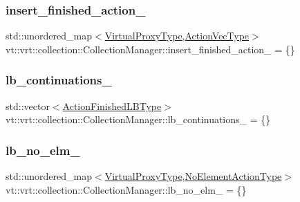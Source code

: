 \subsubsection{\texorpdfstring{insert\+\_\+finished\+\_\+action\+\_\+}{insert\_finished\_action\_}}
{\footnotesize\ttfamily std\+::unordered\+\_\+map$<$\hyperlink{namespacevt_a1b417dd5d684f045bb58a0ede70045ac}{Virtual\+Proxy\+Type},\hyperlink{structvt_1_1vrt_1_1collection_1_1_collection_manager_a51650235f0e53ae08381942eba822679}{Action\+Vec\+Type}$>$ vt\+::vrt\+::collection\+::\+Collection\+Manager\+::insert\+\_\+finished\+\_\+action\+\_\+ = \{\}\hspace{0.3cm}{\ttfamily [private]}}

\mbox{\label{structvt_1_1vrt_1_1collection_1_1_collection_manager_aad857dc811570360f561b1ffc3df1b6c}} 
\subsubsection{\texorpdfstring{lb\+\_\+continuations\+\_\+}{lb\_continuations\_}}
{\footnotesize\ttfamily std\+::vector$<$\hyperlink{structvt_1_1vrt_1_1collection_1_1_collection_manager_a2649daab7b437e1e2bdb5f2eefff29b6}{Action\+Finished\+L\+B\+Type}$>$ vt\+::vrt\+::collection\+::\+Collection\+Manager\+::lb\+\_\+continuations\+\_\+ = \{\}\hspace{0.3cm}{\ttfamily [private]}}

\mbox{\label{structvt_1_1vrt_1_1collection_1_1_collection_manager_af9d6e82381c808b5463e81643967ea59}} 
\subsubsection{\texorpdfstring{lb\+\_\+no\+\_\+elm\+\_\+}{lb\_no\_elm\_}}
{\footnotesize\ttfamily std\+::unordered\+\_\+map$<$\hyperlink{namespacevt_a1b417dd5d684f045bb58a0ede70045ac}{Virtual\+Proxy\+Type},\hyperlink{structvt_1_1vrt_1_1collection_1_1_collection_manager_a6b9b76aadc721cec45d3e0e02d849ff1}{No\+Element\+Action\+Type}$>$ vt\+::vrt\+::collection\+::\+Collection\+Manager\+::lb\+\_\+no\+\_\+elm\+\_\+ = \{\}\hspace{0.3cm}{\ttfamily [private]}}

